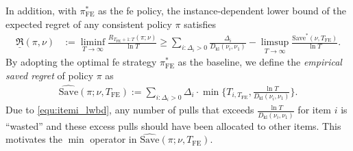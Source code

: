 \documentclass[twoside,11pt]{article}
\newcommand{\kl}{D_{\mathrm{kl}}}
\newcommand{\Tfe}{T_{\mathrm{FE}}}
\newcommand{\Saved}{\mathrm{Save}}
\newcommand{\FE}{\textrm{FE}}
\begin{document}
In addition, with $\pi_{\FE}^*$ as the \ac{fe} policy, the instance-dependent lower bound of the expected regret of any consistent policy $\pi$ satisfies 
\begin{align}
    \underline{\mathfrak{R}}(\pi,\nu) &:= \liminf_{T\to\infty}\frac{R_{\Tfe+1:T} (\pi;\nu )}{\ln T}
    \geq 
    \sum_{i:\Delta_{i}>0}
    \frac{\Delta_i}{\kl(\nu_i,\nu_1)}
    -
    \limsup_{T\to\infty}\frac{\Saved^*(\nu,\Tfe)}{\ln T}.
    \label{equ:lowbd_decomp}
\end{align}
By adopting the optimal \ac{fe} strategy $\pi_{\FE}^*$ as the baseline, we define the \emph{empirical saved regret} of policy $\pi$ as
\begin{align}\label{equ:empi_saved}
    \widehat{\Saved}(\pi;\nu,\Tfe):=
    \sum_{i:\Delta_{i}>0} \Delta_{i}\cdot \min\bigg\{ T_{i,\Tfe},\frac{\ln T}{\kl(\nu_i,\nu_1)}\bigg\}.
\end{align}
Due to \eqref{equ:itemi_lwbd}, any number of pulls that exceeds $\frac{\ln T}{\kl(\nu_i,\nu_1)}$ for item $i$ is ``wasted'' and these excess pulls should have been allocated to other items. This motivates the $\min$ operator in $\widehat{\Saved}(\pi;\nu,\Tfe)$.
\end{document}

